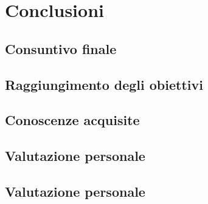 \chapter{Conclusioni}
\label{chap:conclusioni}

\section{Consuntivo finale}


\section{Raggiungimento degli obiettivi}


\section{Conoscenze acquisite}


\section{Valutazione personale}


\section{Valutazione personale}


\newpage